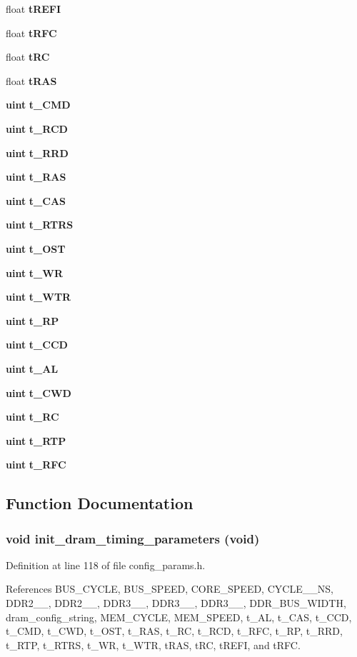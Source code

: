 \begin{CompactItemize}
\item 
float {\bf tREFI}
\item 
float {\bf tRFC}
\item 
float {\bf tRC}
\item 
float {\bf tRAS}
\item 
{\bf uint} {\bf t\_\-CMD}
\item 
{\bf uint} {\bf t\_\-RCD}
\item 
{\bf uint} {\bf t\_\-RRD}
\item 
{\bf uint} {\bf t\_\-RAS}
\item 
{\bf uint} {\bf t\_\-CAS}
\item 
{\bf uint} {\bf t\_\-RTRS}
\item 
{\bf uint} {\bf t\_\-OST}
\item 
{\bf uint} {\bf t\_\-WR}
\item 
{\bf uint} {\bf t\_\-WTR}
\item 
{\bf uint} {\bf t\_\-RP}
\item 
{\bf uint} {\bf t\_\-CCD}
\item 
{\bf uint} {\bf t\_\-AL}
\item 
{\bf uint} {\bf t\_\-CWD}
\item 
{\bf uint} {\bf t\_\-RC}
\item 
{\bf uint} {\bf t\_\-RTP}
\item 
{\bf uint} {\bf t\_\-RFC}
\end{CompactItemize}


\subsection{Function Documentation}
\subsubsection[{init\_\-dram\_\-timing\_\-parameters}]{\setlength{\rightskip}{0pt plus 5cm}void init\_\-dram\_\-timing\_\-parameters (void)}\label{config__params_8h_a91b414eca2957d22f6a86c695a803c6}




Definition at line 118 of file config\_\-params.h.

References BUS\_\-CYCLE, BUS\_\-SPEED, CORE\_\-SPEED, CYCLE\_\_\-NS, DDR2\_\_, DDR2\_\_, DDR3\_\_, DDR3\_\_, DDR3\_\_, DDR\_\-BUS\_\-WIDTH, dram\_\-config\_\-string, MEM\_\-CYCLE, MEM\_\-SPEED, t\_\-AL, t\_\-CAS, t\_\-CCD, t\_\-CMD, t\_\-CWD, t\_\-OST, t\_\-RAS, t\_\-RC, t\_\-RCD, t\_\-RFC, t\_\-RP, t\_\-RRD, t\_\-RTP, t\_\-RTRS, t\_\-WR, t\_\-WTR, tRAS, tRC, tREFI, and tRFC.

